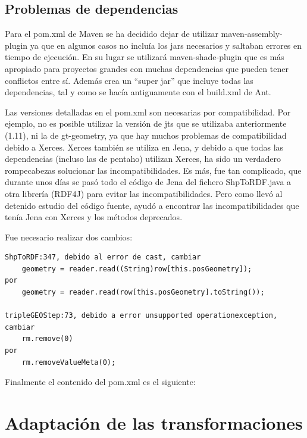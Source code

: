 \subsection{Problemas de dependencias}

Para el pom.xml de Maven se ha decidido dejar de utilizar maven-assembly-plugin ya que en algunos casos no
incluía los jars necesarios y saltaban errores en tiempo de ejecución. En su lugar se utilizará
maven-shade-plugin que es más apropiado para proyectos grandes con muchas dependencias que pueden tener
conflictos entre sí. Además crea un ``super jar'' que incluye todas las dependencias, tal y como se hacía antiguamente
con el build.xml de Ant.

Las versiones detalladas en el pom.xml son necesarias por compatibilidad. Por ejemplo, no es posible utilizar la
versión de jts que se utilizaba anteriormente (1.11), ni la de gt-geometry, ya que hay muchos problemas de compatibilidad debido a
Xerces. Xerces también se utiliza en Jena, y debido a que todas las dependencias (incluso las de pentaho) utilizan
Xerces, ha sido un verdadero rompecabezas solucionar las incompatibilidades. Es más, fue tan complicado, que
durante unos días se pasó todo el código de Jena del fichero ShpToRDF.java a otra librería (RDF4J) para evitar
las incompatibilidades. Pero como llevó al detenido estudio del código fuente, ayudó a encontrar las
incompatibilidades que tenía Jena con Xerces y los métodos deprecados.

Fue necesario realizar dos cambios: 

\begin{lstlisting}
ShpToRDF:347, debido al error de cast, cambiar
    geometry = reader.read((String)row[this.posGeometry]);
por 
    geometry = reader.read(row[this.posGeometry].toString());

tripleGEOStep:73, debido a error unsupported operationexception, cambiar
    rm.remove(0)
por
    rm.removeValueMeta(0);
\end{lstlisting}

Finalmente el contenido del pom.xml es el siguiente:




\section{Adaptación de las transformaciones}

